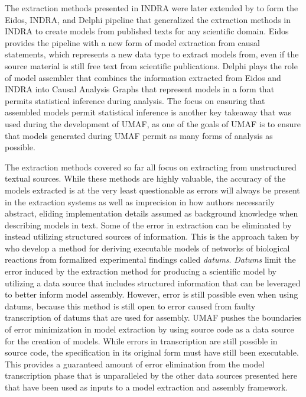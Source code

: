 The extraction methods presented in INDRA were later extended by \citet{EidosIndraDelphi} to form the Eidos, INDRA, and Delphi pipeline that generalized the extraction methods in INDRA to create models from published texts for any scientific domain.
Eidos provides the pipeline with a new form of model extraction from causal statements, which represents a new data type to extract models from, even if the source material is still free text from scientific publications.
Delphi plays the role of model assembler that combines the information extracted from Eidos and INDRA into Causal Analysis Graphs that represent models in a form that permits statistical inference during analysis.
The focus on ensuring that assembled models permit statistical inference is another key takeaway that was used during the development of UMAF, as one of the goals of UMAF is to ensure that models generated during UMAF permit as many forms of analysis as possible.

The extraction methods covered so far all focus on extracting from unstructured textual sources.
While these methods are highly valuable, the accuracy of the models extracted is at the very least questionable as errors will always be present in the extraction systems as well as imprecision in how authors necessarily abstract, eliding implementation details assumed as background knowledge when describing models in text.
Some of the error in extraction can be eliminated by instead utilizing structured sources of information.
This is the approach taken by \citet{nigam2015datums} who develop a method for deriving executable models of networks of biological reactions from formalized experimental findings called \textit{datums}.
\textit{Datums} limit the error induced by the extraction method for producing a scientific model by utilizing a data source that includes structured information that can be leveraged to better inform model assembly.
However, error is still possible even when using datums, because this method is still open to error caused from faulty transcription of datums that are used for assembly.
UMAF pushes the boundaries of error minimization in model extraction by using source code as a data source for the creation of models.
While errors in transcription are still possible in source code, the specification in its original form must have still been executable.
This provides a guaranteed amount of error elimination from the model transcription phase that is unparalleled by the other data sources presented here that have been used as inputs to a model extraction and assembly framework.

